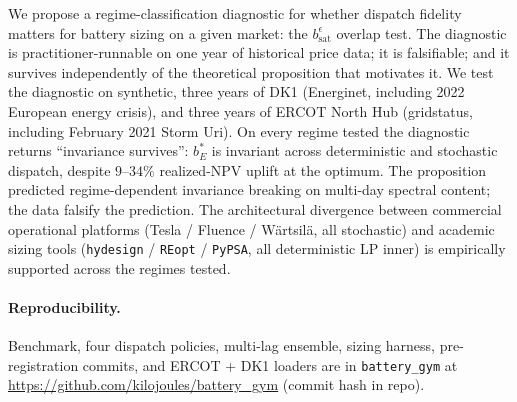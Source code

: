 \documentclass[11pt]{article}
\begin{document}
We propose a regime-classification diagnostic for whether dispatch fidelity matters for battery sizing on a given market: the $b_{\mathrm{sat}}^\epsilon$ overlap test. The diagnostic is practitioner-runnable on one year of historical price data; it is falsifiable; and it survives independently of the theoretical proposition that motivates it. We test the diagnostic on synthetic, three years of DK1 (Energinet, including 2022 European energy crisis), and three years of ERCOT North Hub (gridstatus, including February 2021 Storm Uri). On every regime tested the diagnostic returns ``invariance survives'': $b_E^*$ is invariant across deterministic and stochastic dispatch, despite $9$--$34\%$ realized-NPV uplift at the optimum. The proposition predicted regime-dependent invariance breaking on multi-day spectral content; the data falsify the prediction. The architectural divergence between commercial operational platforms (Tesla / Fluence / W\"{a}rtsil\"{a}, all stochastic) and academic sizing tools (\texttt{hydesign} / \texttt{REopt} / \texttt{PyPSA}, all deterministic LP inner) is empirically supported across the regimes tested.

\paragraph{Reproducibility.}
Benchmark, four dispatch policies, multi-lag ensemble, sizing harness, pre-registration commits, and ERCOT + DK1 loaders are in \texttt{battery\_gym} at \url{https://github.com/kilojoules/battery_gym} (commit hash in repo).
\end{document}
